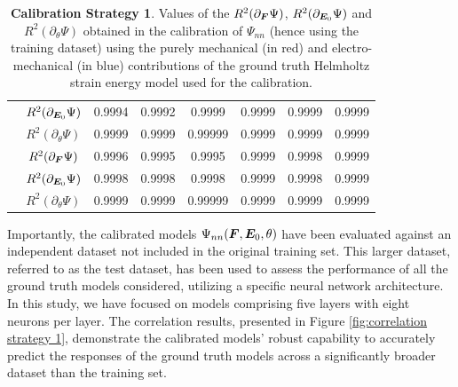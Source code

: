 \begin{table}[hbtp!]
\begin{tabular}{c c c c c c c c }
&$R^2(\partial_{\boldsymbol{E}_0}\Psi)$ &  0.9994 & 0.9992 & 0.9999 & 0.9999 & 0.9999 & 0.9999\\
&$R^2(\partial_{\theta}\Psi)$ & 0.9999 &  0.9999 & 0.99999 & 0.9999 & 0.9999 & 0.9999\\	
\midrule
		\multirow{3}{*}{\rotatebox{90}{\textcolor{red}{\textbf{MR}}/\textcolor{blue}{\textbf{ES}}}} &$R^2(\partial_{\boldsymbol{F}}\Psi)$ &  0.9996 &  0.9995 & 0.9995 & 0.9999 & 0.9998 & 0.9999\\
&$R^2(\partial_{\boldsymbol{E}_0}\Psi)$ & 0.9998 & 0.9998 & 0.9998 & 0.9999 & 0.9998 & 0.9999\\
&$R^2(\partial_{\theta}\Psi)$ & 0.9999 &  0.9999 & 0.99999 & 0.9999 & 0.9999 & 0.9999 \\	
\midrule
	\end{tabular}
	\caption{\textbf{Calibration Strategy 1}. Values of the $R^2(\partial_{\boldsymbol{F}}\Psi)$, $R^2(\partial_{\boldsymbol{E}_0}\Psi)$ and $R^2(\partial_{\theta}\Psi)$ obtained in the calibration of $\Psi_{nn}$ (hence using the training dataset) using the purely mechanical (in red) and electro-mechanical (in blue) contributions of the ground truth Helmholtz strain energy model used for the calibration.}
	\label{table: results calibration strategy 1}
\end{table}


Importantly, the calibrated models $\Psi_{nn}(\boldsymbol{F},\boldsymbol{E}_0,\theta)$ have been evaluated against an independent dataset not included in the original training set. This larger dataset, referred to as the test dataset, has been used to assess the performance of all the ground truth models considered, utilizing a specific neural network architecture. In this study, we have focused on models comprising five layers with eight neurons per layer. The correlation results, presented in Figure \ref{fig:correlation strategy 1},  demonstrate the calibrated models' robust capability to accurately predict the responses of the ground truth models across a significantly broader dataset than the training set.


